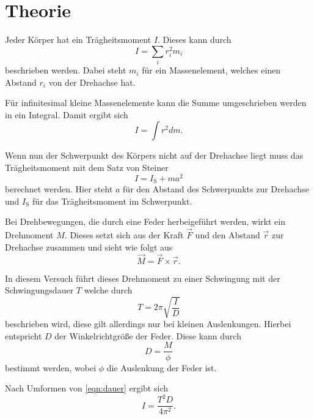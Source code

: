 \section{Theorie}
\label{sec:Theorie}

Jeder Körper hat ein Trägheitsmoment $I$.
Dieses kann durch 
\begin{equation*}
    I = \sum_i r_i^2 m_i
\end{equation*}
beschrieben werden. Dabei steht $m_i$ für ein Massenelement, welches einen Abstand $r_i$ von der Drehachse hat.

Für infinitesimal kleine Massenelemente kann die Summe umgeschrieben werden in ein Integral.
Damit ergibt sich 
\begin{equation*}
    I = \int r^2 dm .
\end{equation*}

Wenn nun der Schwerpunkt des Körpers nicht auf der Drehachse liegt muss das Trägheitsmoment mit dem Satz von Steiner
\begin{equation}
    I = I_\text{S} + m a^2
    \label{eqn:steiner}
\end{equation}
berechnet werden. Hier steht $a$ für den Abstand des Schwerpunkts zur Drehachse und $I_\text{S}$ für das Trägheitsmoment im Schwerpunkt.

Bei Drehbewegungen, die durch eine Feder herbeigeführt werden, wirkt ein Drehmoment $M$.
Dieses setzt sich aus der Kraft $\vec{F}$ und den Abstand $\vec{r}$ zur Drehachse zusammen und sieht wie folgt aus
\begin{equation*}
    \vec{M} = \vec{F} \times \vec{r} .
\end{equation*} 

In diesem Versuch führt dieses Drehmoment zu einer Schwingung mit der Schwingungsdauer $T$ welche durch 
\begin{equation}
    T = 2\pi \sqrt{\frac{I}{D}}
    \label{eqn:dauer}
\end{equation}
beschrieben wird, diese gilt allerdings nur bei kleinen Auslenkungen.
Hierbei entspricht $D$ der Winkelrichtgröße der Feder.
Diese kann durch 
\begin{equation}
    D = \frac{M}{\phi}
    \label{eqn:federstarke}
\end{equation}
bestimmt werden, wobei $\phi$ die Auslenkung der Feder ist.

Nach Umformen von \ref{eqn:dauer} ergibt sich
\begin{equation}
    I = \frac{T^2 D}{4 \pi^2} .
    \label{eqn:tragheit}
\end{equation}

